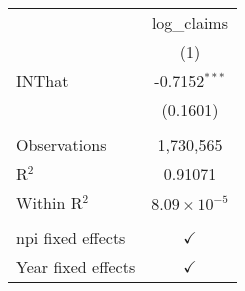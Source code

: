 
\begingroup
\centering
\begin{tabular}{lc}
   \toprule
                      & log\_claims\\   
                      & (1)\\  
   \midrule 
   INThat             & -0.7152$^{***}$\\   
                      & (0.1601)\\   
    \\
   Observations       & 1,730,565\\  
   R$^2$              & 0.91071\\  
   Within R$^2$       & $8.09\times 10^{-5}$\\   
    \\
   npi fixed effects  & $\checkmark$\\   
   Year fixed effects & $\checkmark$\\   
   \bottomrule
\end{tabular}
\par\endgroup


